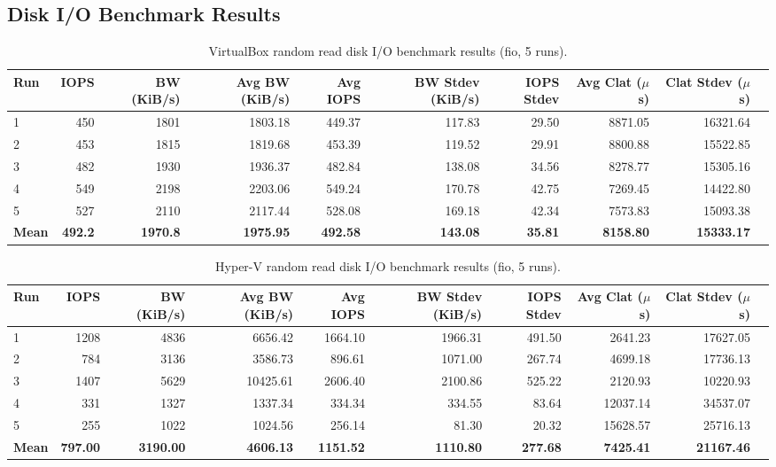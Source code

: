 \documentclass[a4paper, 12pt]{article}
\theoremstyle{plain}
\theoremstyle{definition}
\theoremstyle{remark}
\begin{document}
    \begin{landscape}
    \section{Disk I/O Benchmark Results}
    \begin{table}[H]
    \centering
    \caption{VirtualBox random read disk I/O benchmark results (fio, 5 runs).}
    \label{tab:io-read-vbox}
    \begin{tabular}{lrrrrrrrrr}
    \hline
    \textbf{Run} & \textbf{IOPS} & \textbf{BW (KiB/s)} & \textbf{Avg BW (KiB/s)} & \textbf{Avg IOPS} & \textbf{BW Stdev (KiB/s)} & \textbf{IOPS Stdev} & \textbf{Avg Clat ($\mu$s)} & \textbf{Clat Stdev ($\mu$s)} \\
    \hline
    1 & 450 & 1801 & 1803.18 & 449.37 & 117.83 & 29.50 & 8871.05 & 16321.64 \\
    2 & 453 & 1815 & 1819.68 & 453.39 & 119.52 & 29.91 & 8800.88 & 15522.85 \\
    3 & 482 & 1930 & 1936.37 & 482.84 & 138.08 & 34.56 & 8278.77 & 15305.16 \\
    4 & 549 & 2198 & 2203.06 & 549.24 & 170.78 & 42.75 & 7269.45 & 14422.80 \\
    5 & 527 & 2110 & 2117.44 & 528.08 & 169.18 & 42.34 & 7573.83 & 15093.38 \\
    \hline
    \textbf{Mean} & \textbf{492.2} & \textbf{1970.8} & \textbf{1975.95} & \textbf{492.58} & \textbf{143.08} & \textbf{35.81} & \textbf{8158.80} & \textbf{15333.17} \\
    \hline
    \end{tabular}
    \end{table}

    \begin{table}[H]
    \centering
    \caption{Hyper-V random read disk I/O benchmark results (fio, 5 runs).}
    \label{tab:io-read-hyperv}
    \begin{tabular}{lrrrrrrrrr}
    \hline
    \textbf{Run} & \textbf{IOPS} & \textbf{BW (KiB/s)} & \textbf{Avg BW (KiB/s)} & \textbf{Avg IOPS} & \textbf{BW Stdev (KiB/s)} & \textbf{IOPS Stdev} & \textbf{Avg Clat ($\mu$s)} & \textbf{Clat Stdev ($\mu$s)} \\
    \hline
    1 & 1208 & 4836 & 6656.42 & 1664.10 & 1966.31 & 491.50 & 2641.23 & 17627.05 \\
    2 & 784  & 3136 & 3586.73 &  896.61 & 1071.00 & 267.74 & 4699.18 & 17736.13 \\
    3 & 1407 & 5629 & 10425.61 & 2606.40 & 2100.86 & 525.22 & 2120.93 & 10220.93 \\
    4 & 331  & 1327 & 1337.34 &  334.34 &  334.55 &  83.64 & 12037.14 & 34537.07 \\
    5 & 255  & 1022 & 1024.56 &  256.14 &   81.30 &  20.32 & 15628.57 & 25716.13 \\
    \hline
    \textbf{Mean} & \textbf{797.00} & \textbf{3190.00} & \textbf{4606.13} & \textbf{1151.52} & \textbf{1110.80} & \textbf{277.68} & \textbf{7425.41} & \textbf{21167.46} \\
    \hline
    \end{tabular}
    \end{table}


\end{landscape}
\end{document}
